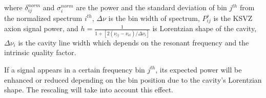 where $\delta_{ij}^{norm}$ and $\sigma_{i}^{norm}$ are the power and the standard deviation of
bin $j^{th}$ from the normalized spectrum $i^{th}$,
$\Delta\nu$ is the bin width of spectrum, $P_{ij}^{s}$ is the KSVZ axion signal power,
and $h = \frac{1}{1 + [2(\nu_{ij} - \nu_{ci})/\Delta\nu_{i}]}$ is Lorentzian shape of the cavity,
$\Delta\nu_{i}$ is the cavity line width which depends on the resonant frequency and the intrinsic quality factor.

If a signal appears in a certain frequency bin $j^{th}$, its expected power will be enhanced or reduced depending on the bin position due to the cavity's Lorentzian shape. The rescaling will take into account this effect.






